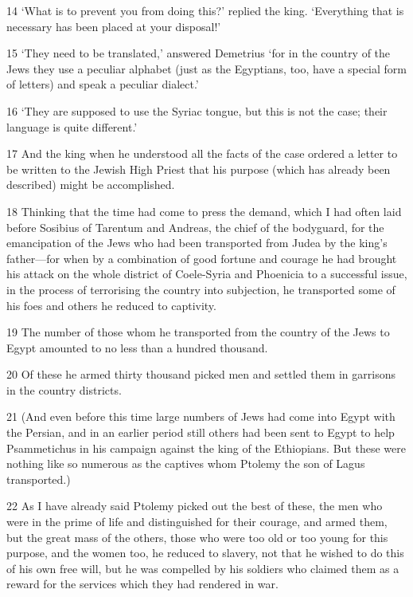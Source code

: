 \par 14 ‘What is to prevent you from doing this?’ replied the king. ‘Everything that is necessary has been placed at your disposal!’

\par 15 ‘They need to be translated,’ answered Demetrius ‘for in the country of the Jews they use a peculiar alphabet (just as the Egyptians, too, have a special form of letters) and speak a peculiar dialect.’

\par 16 ‘They are supposed to use the Syriac tongue, but this is not the case; their language is quite different.’

\par 17 And the king when he understood all the facts of the case ordered a letter to be written to the Jewish High Priest that his purpose (which has already been described) might be accomplished.

\par 18 Thinking that the time had come to press the demand, which I had often laid before Sosibius of Tarentum and Andreas, the chief of the bodyguard, for the emancipation of the Jews who had been transported from Judea by the king's father—for when by a combination of good fortune and courage he had brought his attack on the whole district of Coele-Syria and Phoenicia to a successful issue, in the process of terrorising the country into subjection, he transported some of his foes and others he reduced to captivity.

\par 19 The number of those whom he transported from the country of the Jews to Egypt amounted to no less than a hundred thousand.

\par 20 Of these he armed thirty thousand picked men and settled them in garrisons in the country districts.

\par 21 (And even before this time large numbers of Jews had come into Egypt with the Persian, and in an earlier period still others had been sent to Egypt to help Psammetichus in his campaign against the king of the Ethiopians. But these were nothing like so numerous as the captives whom Ptolemy the son of Lagus transported.)

\par 22 As I have already said Ptolemy picked out the best of these, the men who were in the prime of life and distinguished for their courage, and armed them, but the great mass of the others, those who were too old or too young for this purpose, and the women too, he reduced to slavery, not that he wished to do this of his own free will, but he was compelled by his soldiers who claimed them as a reward for the services which they had rendered in war.

